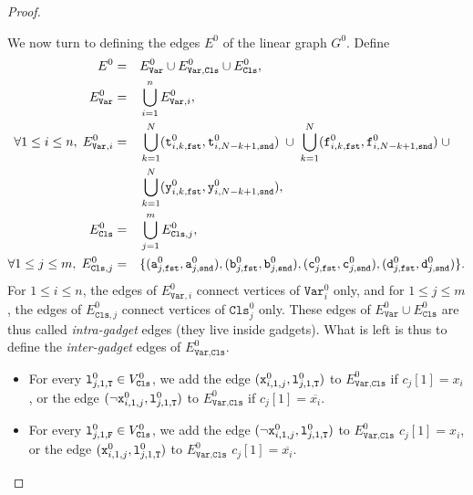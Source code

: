 \begin{proof}
\begin{mdframed}
    We now turn to defining the edges $E^{0}$ of the linear graph $G^{0}$.
    Define
    \begin{alignat*}{2}
      E^{0} &=&& E^{0}_{\texttt{Var}} \cup E^{0}_{\texttt{Var},\texttt{Cls}} \cup E^{0}_{\texttt{Cls}},
      \\
      E^{0}_{\texttt{Var}} &=&& \bigcup_{i=1}^{n} E^{0}_{\texttt{Var}, i},
      \\
      \forall 1\leq i \leq n,\;
      E^{0}_{\texttt{Var}, i} &=&&
      \bigcup_{k=1}^{N} (\texttt{t}^{0}_{i,k,\texttt{fst}}, \texttt{t}^{0}_{i,N-k+1,\texttt{snd}})
      \;\cup\;
      \bigcup_{k=1}^{N} (\texttt{f}^{0}_{i,k,\texttt{fst}}, \texttt{f}^{0}_{i,N-k+1,\texttt{snd}}) \;\cup
      \\
      &&&
      \bigcup_{k=1}^{N} (\texttt{y}^{0}_{i,k,\texttt{fst}}, \texttt{y}^{0}_{i,N-k+1,\texttt{snd}}),
      \\
      E^{0}_{\texttt{Cls}} &=&& \bigcup_{j=1}^{m} E^{0}_{\texttt{Cls}, j},
      \\
      \forall 1\leq j \leq m,\;
      E^{0}_{\texttt{Cls}, j} &=&&
      \{(\texttt{a}^{0}_{j,\texttt{fst}}, \texttt{a}^{0}_{j,\texttt{snd}}),
      (\texttt{b}^{0}_{j,\texttt{fst}}, \texttt{b}^{0}_{j,\texttt{snd}}),
      (\texttt{c}^{0}_{j,\texttt{fst}}, \texttt{c}^{0}_{j,\texttt{snd}}),
      (\texttt{d}^{0}_{j,\texttt{fst}}, \texttt{d}^{0}_{j,\texttt{snd}})\}\text{.}
    \end{alignat*}
    For $1 \leq i \leq n$, the edges of $E^{0}_{\texttt{Var}, i}$ connect
    vertices of $\texttt{Var}^{0}_{i}$ only, and
    for $1 \leq j \leq m$, the edges of $E^{0}_{\texttt{Cls}, j}$ connect
    vertices of $\texttt{Cls}^{0}_{j}$ only.
    These edges of $E^{0}_{\texttt{Var}} \cup E^{0}_{\texttt{Cls}}$ are thus called
    \emph{intra-gadget} edges (they live inside gadgets).
    What is left is thus to define the \emph{inter-gadget} edges of
    $E^{0}_{\texttt{Var},\texttt{Cls}}$.
    \begin{itemize}
      \item
      For every $\texttt{l}^{0}_{j, 1, \texttt{T}} \in V^{0}_{\texttt{Cls}}$,
      we add
      the edge $(\texttt{x}^{0}_{i,1,j}, \texttt{l}^{0}_{j, 1, \texttt{T}})$
      to $E^{0}_{\texttt{Var},\texttt{Cls}}$
      if $c_{j}[1] = x_{i}$, or
      the edge $(\neg\texttt{x}^{0}_{i,1,j}, \texttt{l}^{0}_{j, 1, \texttt{T}})$
      to $E^{0}_{\texttt{Var},\texttt{Cls}}$
      if $c_{j}[1] = \overline{x_{i}}$.

      \item
      For every $\texttt{l}^{0}_{j, 1, \texttt{F}} \in V^{0}_{\texttt{Cls}}$,
      we add
      the edge $(\neg\texttt{x}^{0}_{i,1,j}, \texttt{l}^{0}_{j, 1, \texttt{T}})$
      to $E^{0}_{\texttt{Var},\texttt{Cls}}$
      $c_{j}[1] = x_{i}$, or
      the edge $(\texttt{x}^{0}_{i,1,j}, \texttt{l}^{0}_{j, 1, \texttt{T}})$
      to $E^{0}_{\texttt{Var},\texttt{Cls}}$
      $c_{j}[1] = \overline{x_{i}}$.


\end{itemize}
\end{mdframed}
\end{proof}
